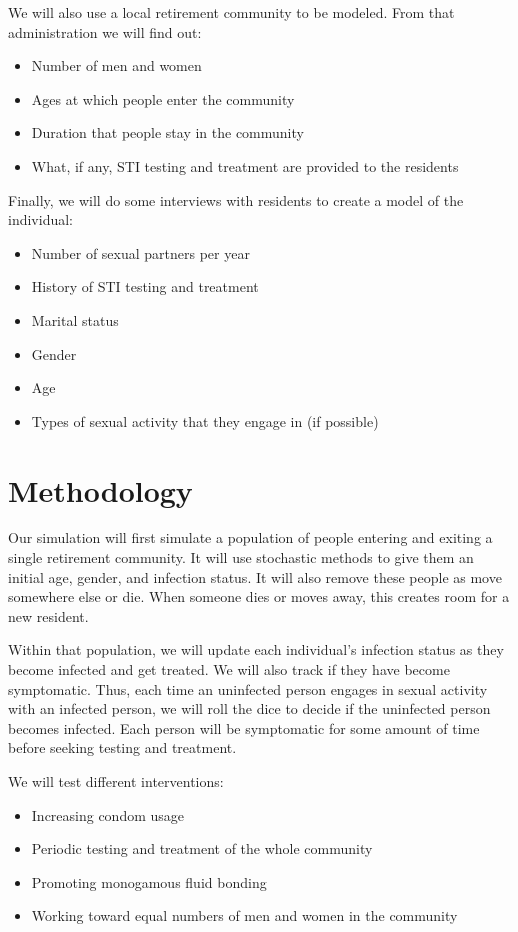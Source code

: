 \documentclass{article}
\begin{document}
\begin{normalsize}
   	We will also use a local retirement community to be modeled. From that administration we will find out:
   	\begin{itemize}
    \item Number of men and women 
    \item Ages at which people enter the community
    \item Duration that people stay in the community
    \item What, if any, STI testing and treatment are provided to the residents
   	\end{itemize}     
   	
   	Finally, we will do some interviews with residents to create a model of the individual:
   	\begin{itemize}
    \item Number of sexual partners per year
    \item History of STI testing and treatment 
    \item Marital status
    \item Gender
    \item Age
    \item Types of sexual activity that they engage in (if possible)
   	\end{itemize}     
   	
   	\section{Methodology}
   	Our simulation will first simulate a population of people entering and exiting a single retirement community. It will use stochastic methods to give them an initial age, gender, and infection status.  It will also remove these people as move somewhere else or die. When someone dies or moves away, this creates room for a new resident.
   	
   	Within that population, we will update each individual's infection status as they become infected and get treated. We will also track if they have become symptomatic. Thus, each time an uninfected person engages in sexual activity with an infected person, we will roll the dice to decide if the uninfected person becomes infected. Each person will be symptomatic for some amount of time before seeking testing and treatment.
   	
   	We will test different interventions:
   	\begin{itemize}
    \item Increasing condom usage
    \item Periodic testing and treatment of the whole community 
    \item Promoting monogamous fluid bonding
	\item Working toward equal numbers of men and women in the community
   	\end{itemize}     
    

\end{normalsize}
\end{document}
